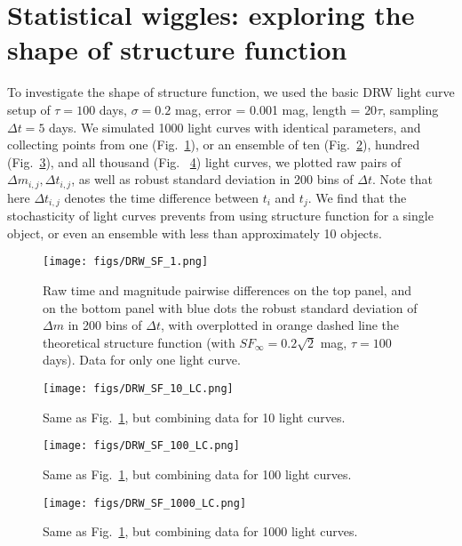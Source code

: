 \documentclass[fleqn,usenatbib]{mnras}  %
\begin{document}
\section{Statistical wiggles:  exploring the shape of structure function}
To investigate the shape of structure function, we used the basic DRW light curve setup of $\tau=100$ days,  $\sigma=0.2$ mag, error = 0.001 mag, length = $20 \tau$, sampling $\Delta t = 5 $ days. We simulated 1000 light curves with identical parameters, and collecting points from  one (Fig.~\ref{fig:sf_1}), or an ensemble of  ten (Fig.~\ref{fig:sf_10}), hundred (Fig.~\ref{fig:sf_100}), and all thousand  (Fig. ~\ref{fig:sf_1000}) light curves, we plotted raw pairs of  $\Delta m_{i,j}, \Delta t_{i,j}$, as well as robust standard deviation in 200 bins of $\Delta t$.  Note that here $\Delta t_{i,j}$ denotes the time difference between $t_{i}$ and $t_{j}$. We find that the stochasticity of light curves prevents from using structure function for a single object, or even an ensemble with less than approximately 10 objects. 

\begin{figure}
\texttt{[image: figs/DRW\_SF\_1.png]}
\caption{Raw time and magnitude pairwise differences on the top panel, and on the bottom panel with blue dots the robust standard deviation of $\Delta m$ in 200 bins of $\Delta t$, with overplotted in orange dashed line the theoretical structure function (with $SF_{\infty}=0.2 \sqrt{2} $ mag, $\tau=100$ days). Data for only one light curve. }
\label{fig:sf_1}
\end{figure}

\begin{figure}
\texttt{[image: figs/DRW\_SF\_10\_LC.png]}
\caption{Same as Fig.~\ref{fig:sf_1}, but combining data for 10 light curves.}
\label{fig:sf_10}
\end{figure}

\begin{figure}
\texttt{[image: figs/DRW\_SF\_100\_LC.png]}
\caption{Same as Fig.~\ref{fig:sf_1}, but combining data for 100 light curves.}
\label{fig:sf_100}
\end{figure}


\begin{figure}
\texttt{[image: figs/DRW\_SF\_1000\_LC.png]}
\caption{Same as Fig.~\ref{fig:sf_1}, but combining data for 1000 light curves.}
\label{fig:sf_1000}
\end{figure}
\end{document}
